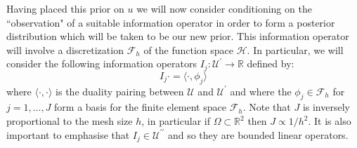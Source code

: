 Having placed this prior on $u$ we will now consider conditioning on the ``observation" of a suitable information operator in order to form a posterior distribution which will be taken to be our new prior. This information operator will involve a discretization $\mathcal{F}_{h}$ of the function space $\mathcal{H}$. In particular, we will consider the following information operators $I_{j}:\mathcal{U}^{\prime}\rightarrow\mathbb{R}$ defined by:
\begin{equation*}
    I_{j}\boldsymbol{\cdot} = \langle\boldsymbol{\cdot},\phi_{j}\rangle
\end{equation*}
where $\langle\boldsymbol{\cdot},\boldsymbol{\cdot}\rangle$ is the duality pairing between $\mathcal{U}$ and $\mathcal{U}^{\prime}$ and where the $\phi_{j}\in\mathcal{F}_{h}$ for $j=1,\dots,J$ form a basis for the finite element space $\mathcal{F}_{h}$. Note that $J$ is inversely proportional to the mesh size $h$, in particular if $\Omega\subset\mathbb{R}^{2}$ then $J\propto 1/h^2$. It is also important to emphasise that $I_{j}\in\mathcal{U}^{\prime\prime}$ and so they are bounded linear operators.

